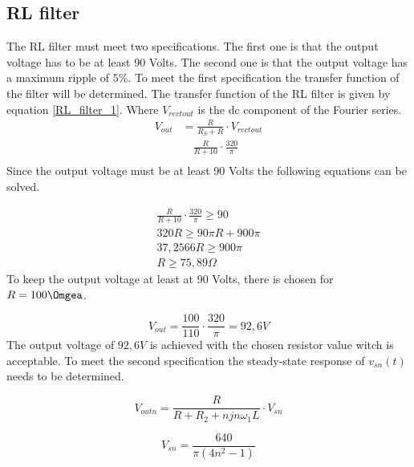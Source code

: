 \subsection{RL filter}
The RL filter must meet two specifications. The first one is that the output voltage has to be at least 90 Volts. The second one is that the output voltage has a maximum ripple of $5\%$. To meet the first specification the transfer function of the filter will be determined. 
The transfer function of the RL filter is given by equation \ref{RL_filter_1}. Where $V_{rectout}$ is the dc component of the Fourier series. \newline
\begin{equation}
\label{RL_filter_1}
\begin{split}
    V_{out} &= \frac{R}{R_S + R} \cdot V_{rectout} \\ 
    &\quad \frac{R}{R+10} \cdot \frac{320}{\pi}\\
\end{split}
\end{equation} 
\newline
Since the output voltage must be at least 90 Volts the following equations can be solved.

\begin{equation}
\label{RL_filter_2}
    \begin{split}
        \frac{R}{R+10} \cdot \frac{320}{\pi} \geq 90 \\
        320R \geq 90\pi R + 900\pi \\
        37,2566R \geq 900\pi\\
        R \geq 75,89 \Omega
    \end{split}
\end{equation}
To keep the output voltage at least at 90 Volts, there is chosen for $R = 100\Omgea$. 

\begin{equation}
  V_{out} = \frac{100}{110} \cdot \frac{320}{\pi} = 92,6V 
\end{equation}
The output voltage of $92,6V$ is achieved with the chosen resistor value witch is acceptable. \newline
To meet the second specification the steady-state response of $v_{sn}(t)$ needs to be determined. 

\begin{equation}
\label{RL_filter_3}
    V_{outn} = \frac{R}{R+R_2+njn\omega_1L} \cdot V_{sn}
\end{equation}

\begin{equation}
\label{RL_filter_4}
    V_{sn} = \frac{640}{\pi(4n^2-1)}
\end{equation}

